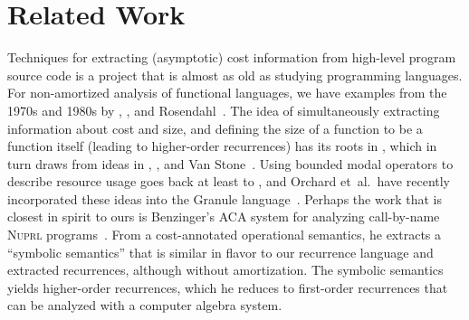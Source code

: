 \section{Related Work}
Techniques for extracting (asymptotic)
cost information from high-level program source
code is a project that is almost as old as studying programming languages.
For non-amortized analysis of
functional languages, we have examples from the 1970s and
1980s by \citet{wegbreit:cacm75}, \citet{lematayer:toplas88}, and
Rosendahl~\cite{rosendahl:auto-complexity-analysis}.  The idea of
simultaneously extracting information about cost and size, and defining the
size of a function to be a function itself (leading to higher-order
recurrences) has its roots in \citet{danner-royer:ats-lmcs},
which in turn draws from ideas in \citet{shultis:complexity},
\citet{sands:thesis}, and Van Stone~\cite{vanstone:thesis}.  Using
bounded modal operators to describe resource usage goes back at least to
\citet{girard-et-al:tcs92:bll}, and Orchard et~al.\ have
recently incorporated these ideas into the Granule
language~\cite{orchard-et-al:icfp19:graded-modal-types}.  Perhaps the
work that is closest in spirit to ours is Benzinger's ACA system for
analyzing call-by-name \textsc{Nuprl} programs~\cite{benzinger:tcs04}.  From
a cost-annotated operational semantics, he extracts a ``symbolic semantics''
that is similar in flavor to our recurrence language and extracted
recurrences, although without amortization.  The symbolic semantics yields
higher-order recurrences, which he reduces to first-order recurrences that
can be analyzed with a computer algebra system.  

